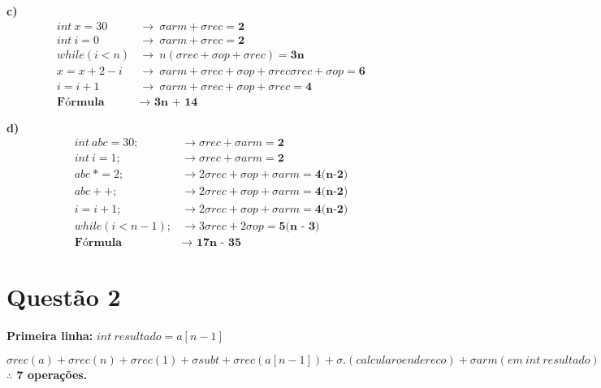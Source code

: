 \documentclass{article}
\begin{document}
\medskip
\noindent
\textbf{c)}
\begin{align}
    int\ x = 30    & \longrightarrow\ \sigma arm + \sigma rec = \textbf{2} \\ 
    int\ i = 0     & \longrightarrow\ \sigma arm + \sigma rec = \textbf{2} \\
    while (i < n) & \longrightarrow\ n (\sigma rec + \sigma op + \sigma rec) = \textbf{3n} \\
    x = x + 2 - i & \longrightarrow\ \sigma arm + \sigma rec + \sigma op + \sigma rec \sigma rec + \sigma op = \textbf{6} \\
    i = i + 1     & \longrightarrow\ \sigma arm + \sigma rec + \sigma op + \sigma rec = \textbf{4} \\
    \textbf{Fórmula } & \textbf{$\longrightarrow$ 3n + 14}
\end{align}

\noindent
\textbf{d)}
\begin{align}
    int\ abc = 30;   & \longrightarrow \sigma rec + \sigma arm = \textbf{2} \\
    int\ i = 1;      & \longrightarrow \sigma rec + \sigma arm = \textbf{2} \\
    abc\ *= 2;       & \longrightarrow 2 \sigma rec + \sigma op + \sigma arm = \textbf{4(n-2)} \\
    abc++;          & \longrightarrow 2 \sigma rec + \sigma op + \sigma arm = \textbf{4(n-2)} \\
    i = i + 1;      & \longrightarrow 2 \sigma rec + \sigma op + \sigma arm = \textbf{4(n-2)} \\
    while(i < n-1); & \longrightarrow 3 \sigma rec + 2 \sigma op = \textbf{5(n - 3)} \\
    \textbf{Fórmula } & \textbf{$\longrightarrow$ 17n - 35}
\end{align}

\pagebreak
\section*{Questão 2}

\textbf{\indent Primeira linha:} $int\ resultado = a[n-1]$

\noindent
$\sigma rec (a) + \sigma rec (n) + \sigma rec (1) + \sigma subt + \sigma rec (a[n-1]) + \sigma . (calcular o endereco) + \sigma arm (em\ int\ resultado);$
\newline \indent
\textbf{$\therefore$ 7 operações.}
\\
\end{document}
